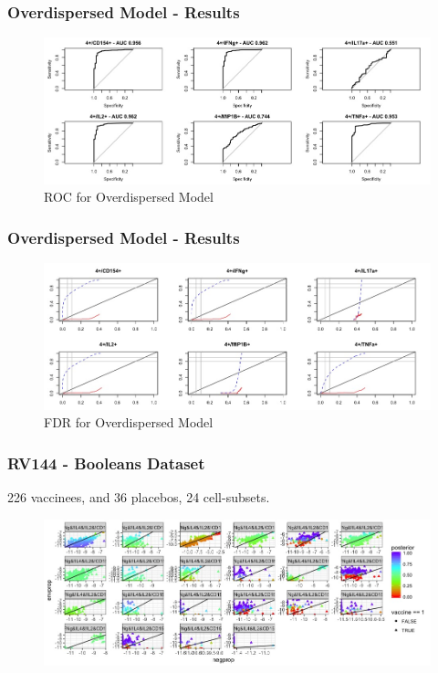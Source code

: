 \documentclass{beamer}
\theoremstyle{definition}
\begin{document}

\begin{frame}
\frametitle{Overdispersed Model - Results}
\begin{figure}[]
\includegraphics[width=12 cm]{figures/marginalBBroc} \caption{ROC for Overdispersed Model}
\end{figure}
\end{frame}


\begin{frame}
\frametitle{Overdispersed Model - Results}
\begin{figure}[]
\includegraphics[width=12 cm]{figures/marginalBBfdr} \caption{FDR for Overdispersed Model}
\end{figure}
\end{frame}


\begin{frame}
\frametitle{RV144 - Booleans Dataset}
226 vaccinees, and 36 placebos, 24 cell-subsets.
\begin{figure}[]
\includegraphics[width=10 cm]{figures/fullBooleansScatter}
\end{figure}
\end{frame}
\end{document}
